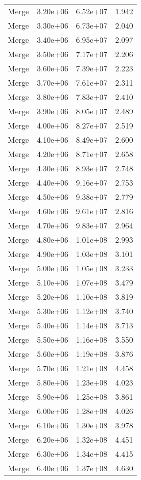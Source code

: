 \begin{table}
\begin{tabular}{llll}
Merge & 3.20e+06 & 6.52e+07 & 1.942 \\
Merge & 3.30e+06 & 6.73e+07 & 2.040 \\
Merge & 3.40e+06 & 6.95e+07 & 2.097 \\
Merge & 3.50e+06 & 7.17e+07 & 2.206 \\
Merge & 3.60e+06 & 7.39e+07 & 2.223 \\
Merge & 3.70e+06 & 7.61e+07 & 2.311 \\
Merge & 3.80e+06 & 7.83e+07 & 2.410 \\
Merge & 3.90e+06 & 8.05e+07 & 2.489 \\
Merge & 4.00e+06 & 8.27e+07 & 2.519 \\
Merge & 4.10e+06 & 8.49e+07 & 2.600 \\
Merge & 4.20e+06 & 8.71e+07 & 2.658 \\
Merge & 4.30e+06 & 8.93e+07 & 2.748 \\
Merge & 4.40e+06 & 9.16e+07 & 2.753 \\
Merge & 4.50e+06 & 9.38e+07 & 2.779 \\
Merge & 4.60e+06 & 9.61e+07 & 2.816 \\
Merge & 4.70e+06 & 9.83e+07 & 2.964 \\
Merge & 4.80e+06 & 1.01e+08 & 2.993 \\
Merge & 4.90e+06 & 1.03e+08 & 3.101 \\
Merge & 5.00e+06 & 1.05e+08 & 3.233 \\
Merge & 5.10e+06 & 1.07e+08 & 3.479 \\
Merge & 5.20e+06 & 1.10e+08 & 3.819 \\
Merge & 5.30e+06 & 1.12e+08 & 3.740 \\
Merge & 5.40e+06 & 1.14e+08 & 3.713 \\
Merge & 5.50e+06 & 1.16e+08 & 3.550 \\
Merge & 5.60e+06 & 1.19e+08 & 3.876 \\
Merge & 5.70e+06 & 1.21e+08 & 4.458 \\
Merge & 5.80e+06 & 1.23e+08 & 4.023 \\
Merge & 5.90e+06 & 1.25e+08 & 3.861 \\
Merge & 6.00e+06 & 1.28e+08 & 4.026 \\
Merge & 6.10e+06 & 1.30e+08 & 3.978 \\
Merge & 6.20e+06 & 1.32e+08 & 4.451 \\
Merge & 6.30e+06 & 1.34e+08 & 4.415 \\
Merge & 6.40e+06 & 1.37e+08 & 4.630 \\

\end{tabular}
\end{table}
